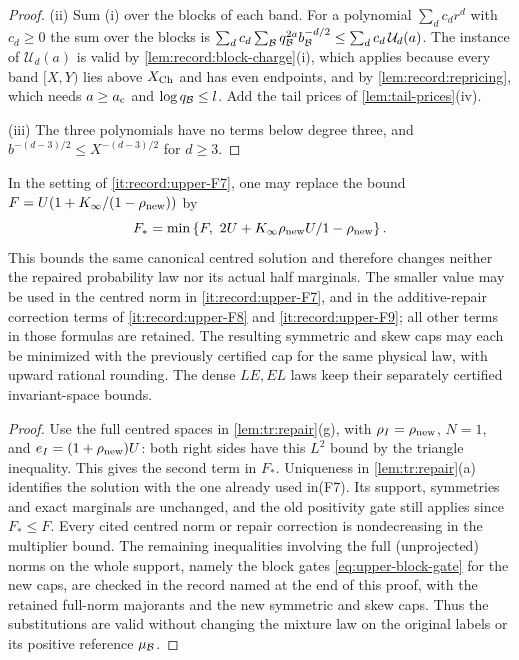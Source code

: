 \begin{proof}
(ii) Sum (i) over the blocks of each band. For a polynomial $\sum_dc_dr^d$ with
$c_d\ge0$ the sum over the blocks is $\sum_dc_d\sum_\Blk q_\Blk^{2a}b_\Blk^{-d/2}
\le\sum_dc_d\,\mathcal U_d(a)$. The instance of $\mathcal U_d(a)$ is valid by
\cref{lem:record:block-charge}(i), which applies because every band $[X,Y)$ lies
above $X_{\rm Ch}$ and has even endpoints, and by \cref{lem:record:repricing},
which needs $a\ge a_{\rm c}$ and $\log q_\Blk\le l$. Add the tail prices of
\cref{lem:tail-prices}(iv).

(iii) The three polynomials have no terms below degree three, and
$b^{-(d-3)/2}\le X^{-(d-3)/2}$ for $d\ge3$.
\end{proof}

\begin{lemma}
\label{lem:upper:neumann-refinement}
In the setting of \ref{it:record:upper-F7}, one may replace the bound
$F=U(1+K_\infty/(1-\rho_{\rm new}))$ by
\[
 F_* = \min\left\{F,\ 2U+
       \frac{K_\infty\rho_{\rm new}U}{1-\rho_{\rm new}}\right\}.
\]
This bounds the same canonical centred solution and therefore changes
neither the repaired probability law nor its actual half marginals.
The smaller value may be used in the centred norm in
\ref{it:record:upper-F7}, and in the additive-repair correction terms
of \ref{it:record:upper-F8} and \ref{it:record:upper-F9}; all other
terms in those formulas are retained. The resulting symmetric and
skew caps may each be minimized with the previously certified cap
for the same physical law, with upward rational rounding. The dense
$LE,EL$ laws keep their separately certified invariant-space bounds.
\end{lemma}
\begin{proof}
Use the full centred spaces in \cref{lem:tr:repair}(g), with
$\rho_I=\rho_{\rm new}$, $N=1$, and
$e_I=(1+\rho_{\rm new})U$: both right sides have this $L^2$ bound
by the triangle inequality. This gives the second term in $F_*$.
Uniqueness in \cref{lem:tr:repair}(a) identifies the solution with the
one already used in(F7). Its support, symmetries and exact marginals
are unchanged, and the old positivity gate still applies since
$F_*\le F$. Every cited centred norm or repair correction is
nondecreasing in the multiplier bound. The remaining inequalities
involving the full (unprojected) norms on the whole support,
namely the block gates \eqref{eq:upper-block-gate} for the new
caps, are checked in the record named at the end of this proof,
with the retained full-norm majorants and the new symmetric and
skew caps. Thus the substitutions are valid without changing the
mixture law on the original labels or its positive reference
$\mu_\Blk$.
\end{proof}


